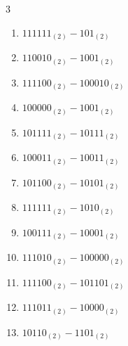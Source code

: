 \begin{multicols}{3}
\begin{enumerate}
  \item $111111_{(2)} - 101_{(2)}$


  \item $110010_{(2)} - 1001_{(2)}$


  \item $111100_{(2)} - 100010_{(2)}$


\columnbreak %

  \item $100000_{(2)} - 1001_{(2)}$


  \item $101111_{(2)} - 10111_{(2)}$


  \item $100011_{(2)} - 10011_{(2)}$


  \item $101100_{(2)} - 10101_{(2)}$


  \item $111111_{(2)} - 1010_{(2)}$


  \item $100111_{(2)} - 10001_{(2)}$


  \item $111010_{(2)} - 100000_{(2)}$


  \item $111100_{(2)} - 101101_{(2)}$


  \item $111011_{(2)} - 10000_{(2)}$


  \item $10110_{(2)} - 1101_{(2)}$


\columnbreak %


\end{enumerate}
\end{multicols}
